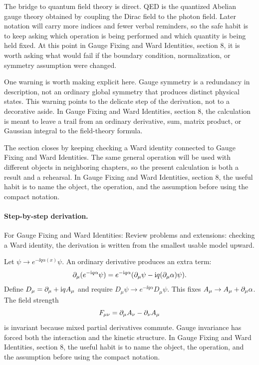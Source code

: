The bridge to quantum field theory is direct.  QED is the quantized Abelian gauge theory obtained by coupling the Dirac field to the photon field.  Later notation will carry more indices and fewer verbal reminders, so the safe habit is to keep asking which operation is being performed and which quantity is being held fixed.  At this point in Gauge Fixing and Ward Identities, section 8, it is worth asking what would fail if the boundary condition, normalization, or symmetry assumption were changed.

One warning is worth making explicit here.  Gauge symmetry is a redundancy in description, not an ordinary global symmetry that produces distinct physical states.  This warning points to the delicate step of the derivation, not to a decorative aside.  In Gauge Fixing and Ward Identities, section 8, the calculation is meant to leave a trail from an ordinary derivative, sum, matrix product, or Gaussian integral to the field-theory formula.

The section closes by keeping checking a Ward identity connected to Gauge Fixing and Ward Identities.  The same general operation will be used with different objects in neighboring chapters, so the present calculation is both a result and a rehearsal.  In Gauge Fixing and Ward Identities, section 8, the useful habit is to name the object, the operation, and the assumption before using the compact notation.



\paragraph{Step-by-step derivation.}

For Gauge Fixing and Ward Identities: Review problems and extensions: checking a Ward identity, the derivation is written from the smallest usable model upward.

Let \(\psi\to e^{-\ii q\alpha(x)}\psi\).  An ordinary derivative produces an extra term:
\[
  \partial_\mu(e^{-\mathrm i q\alpha}\psi)
  =
  e^{-\mathrm i q\alpha}(\partial_\mu\psi-\mathrm i q(\partial_\mu\alpha)\psi).
\]
Define \(D_\mu=\partial_\mu+\mathrm i qA_\mu\) and require \(D_\mu\psi\to e^{-\ii q\alpha}D_\mu\psi\).  This fixes \(A_\mu\to A_\mu+\partial_\mu\alpha\).  The field strength
\[
  F_{\mu\nu}=\partial_\mu A_\nu-\partial_\nu A_\mu
\]
is invariant because mixed partial derivatives commute.  Gauge invariance has forced both the interaction and the kinetic structure.  In Gauge Fixing and Ward Identities, section 8, the useful habit is to name the object, the operation, and the assumption before using the compact notation.

